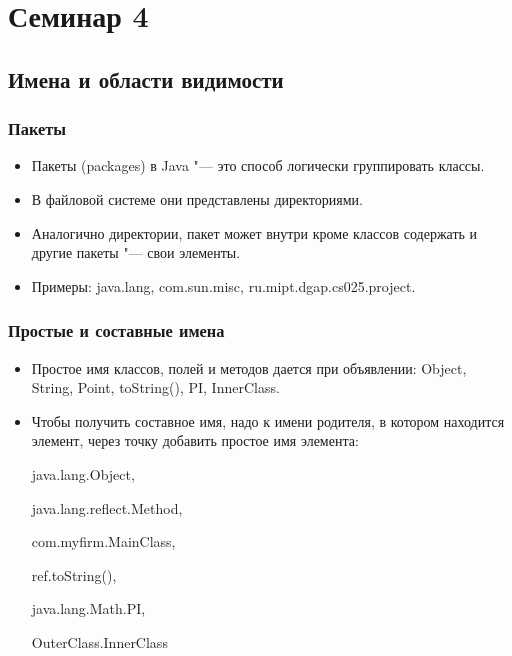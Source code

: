\documentclass[default]{beamer}
\begin{document}
	\section{Семинар 4}
	\subsection{Имена и области видимости}
	\begin{frame}
		\frametitle{Пакеты}
		
		\begin{itemize}
			\item Пакеты (packages) в Java "--- это способ логически группировать классы.
			\item В файловой системе они представлены директориями.
			\item Аналогично директории, пакет может внутри кроме классов содержать и другие пакеты "--- свои элементы.
			\item Примеры: java.lang, com.sun.misc, ru.mipt.dgap.cs025.project.
		\end{itemize}
	\end{frame}
	
	\begin{frame}
		\frametitle{Простые и составные имена}
		
		\begin{itemize}
			\item Простое имя классов, полей и методов дается при объявлении: Object, String, Point, toString(), PI, InnerClass.
			\item Чтобы получить составное имя, надо к имени родителя, в котором находится элемент, через точку добавить простое имя элемента:
			
			java.lang.Object, 
			
			java.lang.reflect.Method, 
			
			com.myfirm.MainClass, 
			
			ref.toString(), 
			
			java.lang.Math.PI, 
			
			OuterClass.InnerClass
		\end{itemize}
	\end{frame}

\end{document}
